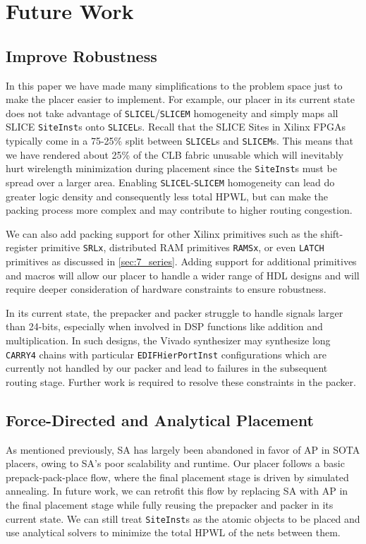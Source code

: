 \section{Future Work}


\subsection{Improve Robustness}
In this paper we have made many simplifications to the problem space just to make the placer easier to implement.
For example, our placer in its current state does not take advantage of \texttt{SLICEL}/\texttt{SLICEM} homogeneity and simply maps all SLICE \texttt{SiteInst}s onto \texttt{SLICEL}s. 
Recall that the SLICE Sites in Xilinx FPGAs typically come in a 75-25\% split between \texttt{SLICEL}s and \texttt{SLICEM}s. 
This means that we have rendered about 25\% of the CLB fabric unusable which will inevitably hurt wirelength minimization during placement since the \texttt{SiteInst}s must be spread over a larger area. 
Enabling \texttt{SLICEL}-\texttt{SLICEM} homogeneity can lead do greater logic density and consequently less total HPWL, but can make the packing process more complex and may contribute to higher routing congestion.

We can also add packing support for other Xilinx primitives such as the shift-register primitive \texttt{SRLx}, distributed RAM primitives \texttt{RAMSx}, or even \texttt{LATCH} primitives as discussed in \ref{sec:7_series}.
Adding support for additional primitives and macros will allow our placer to handle a wider range of HDL designs and will require deeper consideration of hardware constraints to ensure robustness.

In its current state, the prepacker and packer struggle to handle signals larger than 24-bits, especially when involved in DSP functions like addition and multiplication. 
In such designs, the Vivado synthesizer may synthesize long \texttt{CARRY4} chains with particular \texttt{EDIFHierPortInst} configurations which are currently not handled by our packer and lead to failures in the subsequent routing stage.
Further work is required to resolve these constraints in the packer.

\subsection{Force-Directed and Analytical Placement}
As mentioned previously, SA has largely been abandoned in favor of AP in SOTA placers, owing to SA's poor scalability and runtime.
Our placer follows a basic prepack-pack-place flow, where the final placement stage is driven by simulated annealing. 
In future work, we can retrofit this flow by replacing SA with AP in the final placement stage while fully reusing the prepacker and packer in its current state. 
We can still treat \texttt{SiteInst}s as the atomic objects to be placed and use analytical solvers to minimize the total HPWL of the nets between them. 

